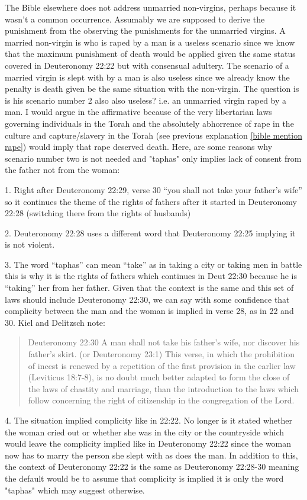 \documentclass[11pt]{article}
\begin{document}
The Bible elsewhere does not address unmarried non-virgins, perhaps because it wasn't a common occurrence. Assumably we are supposed to derive the punishment from the observing the punishments for the unmarried virgins. A married non-virgin is who is raped by a man is a useless scenario since we know that the maximum punishment of death would be applied given the same status covered in Deuteronomy 22:22 but with consensual adultery. The scenario of a married virgin is slept with by a man is also useless since we already know the penalty is death given be the same situation with the non-virgin. The question is is his scenario number 2 also also useless? i.e. an unmarried virgin raped by a man. I would argue in the affirmative because of the very libertarian laws governing individuals in the Torah and the absolutely abhorrence of rape in the culture and capture/slavery in the Torah (see previous explanation \ref{bible mention rape}) would imply that rape deserved death. Here, are some reasons why scenario number two is not needed and "taphas" only implies lack of consent from the father not from the woman:

1. Right after Deuteronomy 22:29, verse 30 “you shall not take your father’s wife” so it continues the theme of the rights of fathers after it started in Deuteronomy 22:28 (switching there from the rights of husbands)

2. Deuteronomy 22:28 uses a different word that Deuteronomy 22:25 implying it is not violent.

3. The word “taphas” can mean “take” as in taking a city or taking men in battle this is why it is the rights of fathers which continues in Deut 22:30 because he is “taking” her from her father. 
Given that the context is the same and this set of laws should include Deuteronomy 22:30, we can say with some confidence that complicity between the man and the woman is implied in verse 28, as in 22 and 30. Kiel and Delitzsch note:
\begin{quote}
Deuteronomy 22:30
A man shall not take his father's wife, nor discover his father's skirt.
(or Deuteronomy 23:1) This verse, in which the prohibition of incest is renewed by a repetition of the first provision in the earlier law (Leviticus 18:7-8), is no doubt much better adapted to form the close of the laws of chastity and marriage, than the introduction to the laws which follow concerning the right of citizenship in the congregation of the Lord.
\end{quote}

4. The situation implied complicity like in 22:22. No longer is it stated whether the woman cried out or whether she was in the city or the countryside which would leave the complicity implied like in Deuteronomy 22:22 since the woman now has to marry the person she slept with as does the man.
In addition to this, the context of Deuteronomy 22:22 is the same as Deuteronomy 22:28-30 meaning the default would be to assume that complicity is implied it is only the word "taphas" which may suggest otherwise. 
\end{document}
